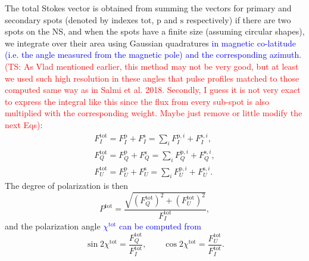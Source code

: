 \documentclass{aa}
\newcommand{\be}{\begin{equation}}
\newcommand{\ee}{\end{equation}}
\newcommand{\red}[1]{\textcolor{red}{#1}}
\newcommand{\blue}[1]{\textcolor{blue}{#1}}
\newcommand{\ftot}{F^{\mathrm{tot}}}
\newcommand{\fluxp}{F^{\mathrm{p}}}
\newcommand{\fluxs}{F^{\mathrm{s}}}
\begin{document}
The total Stokes vector is obtained from summing the vectors for primary and secondary spots (denoted by indexes $\mathrm{tot}$, $\mathrm{p}$ and $\mathrm{s}$ respectively) if there are two spots on the NS, and when the spots have a finite size (assuming circular shapes), we integrate over their area using Gaussian quadratures \blue{in magnetic co-latitude (i.e. the angle measured from the magnetic pole) and the corresponding azimuth.} \red{(TS: As Vlad mentioned earlier, this method may not be very good, but at least we used such high resolution in these angles that pulse profiles matched to those computed same way as in Salmi et al. 2018. Secondly, I guess it is not very exact to express the integral like this since the flux from every sub-spot is also multiplied with the corresponding weight. Maybe just remove or little modify the next Eqs)}:
\begin{align}
\ftot_I=\fluxp_I+\fluxs_I = \sum_i F_I^{\mathrm{p},i}+F_I^{\mathrm{s},i}, \nonumber \\
\ftot_Q=\fluxp_Q+\fluxs_Q = \sum_i F_Q^{\mathrm{p},i}+F_Q^{\mathrm{s},i} ,  \\
\ftot_U=\fluxp_U+\fluxs_U= \sum_i F_U^{\mathrm{p},i}+F_U^{\mathrm{s},i}  . \nonumber
\end{align}
The degree of polarization is then
\be
P^{\mathrm{tot}}=\frac{\sqrt{(\ftot_Q)^2+(\ftot_U)^2}}{\ftot_I},
\ee
and the polarization angle \blue{$\chi^{\mathrm{tot}}$ can be computed from }
\be
\sin{2\chi^{\mathrm{tot}}}=\frac{\ftot_Q}{\ftot_I}, \qquad 
\cos{2\chi^{\mathrm{tot}}}=\frac{\ftot_U}{\ftot_I}.
\ee

\end{document}
